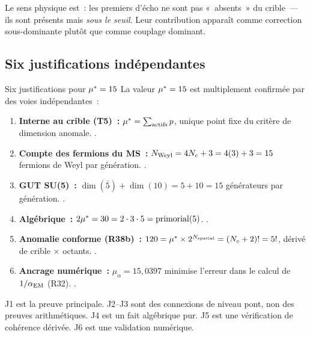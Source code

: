 \documentclass[12pt,a4paper]{article}
\begin{document}
Le sens physique est~: les premiers d'écho ne sont pas «~absents~»
du crible~--- ils sont présents mais \emph{sous le seuil}. Leur
contribution apparaît comme correction sous-dominante plutôt que
comme couplage dominant.

\subsection{Six justifications indépendantes}
\label{sec:ch8_six}

\begin{thmbox}{Six justifications pour ${\mu^{*}} = 15$}
\label{thm:six_justifications}
La valeur ${\mu^{*}} = 15$ est multiplement confirmée par des voies
indépendantes~:
\begin{enumerate}[leftmargin=*, label=\textbf{J\arabic*.}]
\item \textbf{Interne au crible (T5)~:}
  ${\mu^{*}} = \sum_{\text{actifs}} p$, unique point fixe du critère
  de dimension anomale. \THMTAG.
\item \textbf{Compte des fermions du MS~:}
  $N_{\rm Weyl} = 4N_c + 3 = 4(3)+3 = 15$ fermions de Weyl par
  génération. \BRIDGETAG.
\item \textbf{GUT SU(5)~:} $\dim(\bar{5}) + \dim(10) = 5 + 10 = 15$
  générateurs par génération. \BRIDGETAG.
\item \textbf{Algébrique~:}
  $2{\mu^{*}} = 30 = 2 \cdot 3 \cdot 5 = \mathrm{primorial}(5)$.
  \IDTAG.
\item \textbf{Anomalie conforme (R38b)~:}
  $120 = {\mu^{*}} \times 2^{N_{\rm spatial}} = (N_c + 2)! = 5!$,
  dérivé de crible $\times$ octants. \BRIDGETAG.
\item \textbf{Ancrage numérique~:} $\mu_\alpha = 15{,}0397$
  minimise l'erreur dans le calcul de $1/\alpha_{\rm EM}$ (R32).
  \VALTAG.
\end{enumerate}
\end{thmbox}

J1 est la preuve principale. J2--J3 sont des connexions de niveau
pont, non des preuves arithmétiques. J4 est un fait algébrique pur.
J5 est une vérification de cohérence dérivée. J6 est une validation
numérique.
\end{document}
